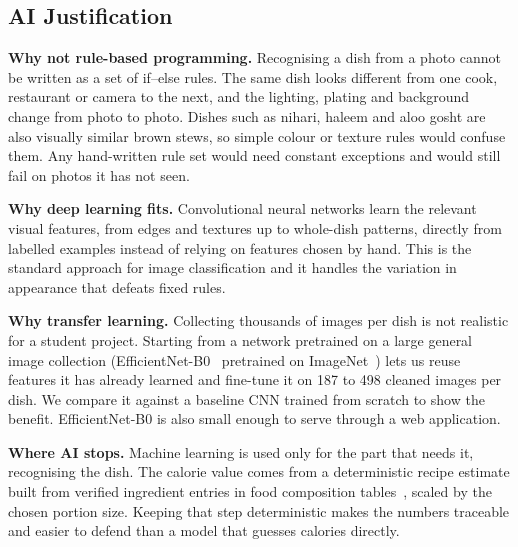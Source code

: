\subsection{AI Justification}
\textbf{Why not rule-based programming.} Recognising a dish from a photo cannot
be written as a set of if--else rules. The same dish looks different from one
cook, restaurant or camera to the next, and the lighting, plating and
background change from photo to photo. Dishes such as nihari, haleem and
aloo gosht are also visually similar brown stews, so simple colour or texture
rules would confuse them. Any hand-written rule set would need constant
exceptions and would still fail on photos it has not seen.

\textbf{Why deep learning fits.} Convolutional neural networks learn the
relevant visual features, from edges and textures up to whole-dish patterns,
directly from labelled examples instead of relying on features chosen by hand.
This is the standard approach for image classification and it handles the
variation in appearance that defeats fixed rules.

\textbf{Why transfer learning.} Collecting thousands of images per dish is not
realistic for a student project. Starting from a network pretrained on a large
general image collection (EfficientNet-B0~\cite{tan2019efficientnet} pretrained
on ImageNet~\cite{deng2009imagenet}) lets us reuse features it has already
learned and fine-tune it on 187 to 498 cleaned images per dish. We compare it
against a baseline CNN trained from scratch to show the benefit.
EfficientNet-B0 is also small enough to serve through a web application.

\textbf{Where AI stops.} Machine learning is used only for the part that needs
it, recognising the dish. The calorie value comes from a deterministic recipe
estimate built from verified ingredient entries in food composition
tables~\cite{longvah2017ifct,cofid2021}, scaled by the chosen portion size.
Keeping that step deterministic makes the numbers traceable and easier to
defend than a model that guesses calories directly.

